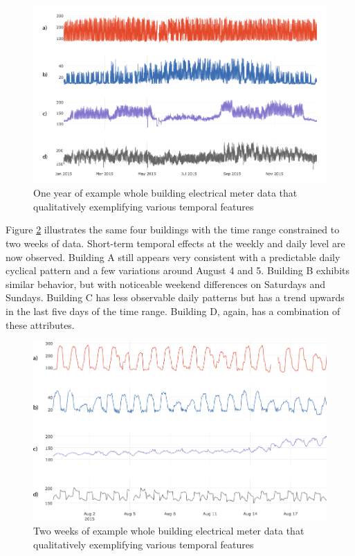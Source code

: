 \begin{figure}[ht!]
\begin{center}
\includegraphics[width=0.98\columnwidth]{figures/temporal_metering_examples/temporal_metering_examples}
\caption{One year of example whole building electrical meter data that qualitatively exemplifying various temporal features
\label{fig:electricalmeters_oneyear}%
}
\end{center}
\end{figure}

Figure \ref{fig:electricalmeters_twoweeks} illustrates the same four buildings with the time range constrained to two weeks of data. Short-term temporal effects at the weekly and daily level are now observed. Building A still appears very consistent with a predictable daily cyclical pattern and a few variations around August 4 and 5. Building B exhibits similar behavior, but with noticeable weekend differences on Saturdays and Sundays. Building C has less observable daily patterns but has a trend upwards in the last five days of the time range. Building D, again, has a combination of these attributes.

\begin{figure}[ht!]
\begin{center}
\includegraphics[width=0.98\columnwidth]{figures/temporal_metering_examples_zoomedin/temporal_metering_examples_zoomedin}
\caption{Two weeks of example whole building electrical meter data that qualitatively exemplifying various temporal features
\label{fig:electricalmeters_twoweeks}%
}
\end{center}
\end{figure}

